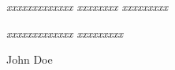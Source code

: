 $\!$\\
$\!$\\
$\!$\\
$\!$\\
$\!$\\
$\!$\\
$\!$\\
$\!$\\
$\!$\\
$\!$\\
$\!$\\
$\!$\\
$\!$\\
$\!$\\
$\!$\\
$\!$\\
$\!$\\
$\!$\\
$\!$\\
$\!$\\
$\!$\\
$\!$\\

\begin{flushright}
\textit{xxxxxxxxxxxxx xxxxxxxx xxxxxxxxx}
\end{flushright}
\vspace{-1cm}
\begin{flushright}
\textit{xxxxxxxxxxxxx xxxxxxxxx}
\end{flushright}
\begin{flushright}
John Doe
\end{flushright}

\thispagestyle{empty}